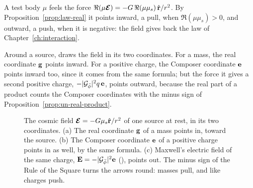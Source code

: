 A test body $\mu$ feels the force $\Re(\mu\boldsymbol{\mathcal{E}}) = -G\,\Re(\mu\mu_s)\,\hat{\mathbf{r}}/r^2$. By Proposition~\ref{prop:law-real} it points inward, a pull, when $\Re(\mu\mu_s) > 0$, and outward, a push, when it is negative: the field gives back the law of Chapter~\ref{ch:interaction}.

Around a source,  draws the field in its two coordinates. For a mass, the real coordinate $\mathbf{g}$ points inward. For a positive charge, the Composer coordinate $\mathbf{e}$ points inward too, since it comes from the same formula; but the force it gives a second positive charge, $-|\mathcal{G}_{\bar{\phi}}|^2 q\,\mathbf{e}$, points outward, because the real part of a product counts the Composer coordinates with the minus sign of Proposition~\ref{prop:un-real-product}.

\suppressfloats[t]
\begin{figure}[tb]
\myfloatalign
{}
\caption[One field, two coordinates]{The cosmic field $\boldsymbol{\mathcal{E}} = -G\mu_s\hat{\mathbf{r}}/r^2$ of one source at rest, in its two coordinates. (a) The real coordinate $\mathbf{g}$ of a mass points in, toward the source. (b) The Composer coordinate $\mathbf{e}$ of a positive charge points in as well, by the same formula. (c) Maxwell's electric field of the same charge, $\mathbf{E} = -|\mathcal{G}_{\bar{\phi}}|^2\mathbf{e}$ (), points out. The minus sign of the Rule of the Square turns the arrows round: masses pull, and like charges push.}
\label{fig:un-sources}
\end{figure}

